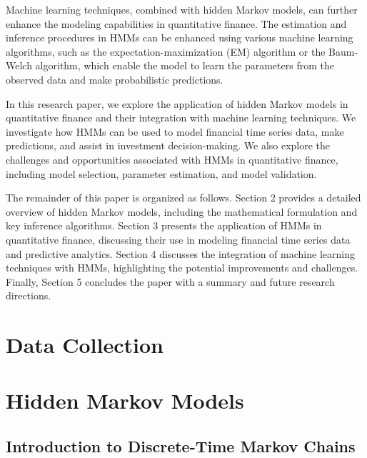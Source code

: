 \documentclass[a4paper,11pt]{article}
\begin{document}
Machine learning techniques, combined with hidden Markov models, can further enhance the modeling capabilities in quantitative finance. The estimation and inference procedures in HMMs can be enhanced using various machine learning algorithms, such as the expectation-maximization (EM) algorithm or the Baum-Welch algorithm, which enable the model to learn the parameters from the observed data and make probabilistic predictions.

In this research paper, we explore the application of hidden Markov models in quantitative finance and their integration with machine learning techniques. We investigate how HMMs can be used to model financial time series data, make predictions, and assist in investment decision-making. We also explore the challenges and opportunities associated with HMMs in quantitative finance, including model selection, parameter estimation, and model validation.

The remainder of this paper is organized as follows. Section 2 provides a detailed overview of hidden Markov models, including the mathematical formulation and key inference algorithms. Section 3 presents the application of HMMs in quantitative finance, discussing their use in modeling financial time series data and predictive analytics. Section 4 discusses the integration of machine learning techniques with HMMs, highlighting the potential improvements and challenges. Finally, Section 5 concludes the paper with a summary and future research directions.


\section{Data Collection}
\label{sec:data_collection}

\section{Hidden Markov Models}
\label{sec:HHMs}

\subsection{Introduction to Discrete-Time Markov Chains}
\label{sec:Intro-to-HHM}
\end{document}
